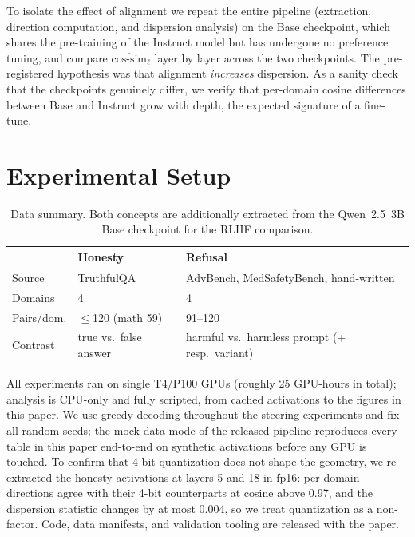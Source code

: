 \documentclass[11pt]{article}
\newcommand{\cosim}{\text{cos-sim}}
\begin{document}
To isolate the effect of alignment we repeat the entire pipeline
(extraction, direction computation, and dispersion analysis) on the Base
checkpoint, which shares the pre-training of the Instruct model but has
undergone no preference tuning, and compare
$\overline{\cosim}_\ell$ layer by layer across the two checkpoints. The
pre-registered hypothesis was that alignment \emph{increases} dispersion. As
a sanity check that the checkpoints genuinely differ, we verify that
per-domain cosine differences between Base and Instruct grow with depth, the
expected signature of a fine-tune.


\section{Experimental Setup}
\label{sec:setup}

\begin{table}[t]
  \centering
  \small
  \renewcommand{\arraystretch}{1.2}
  \begin{tabular}{@{}l p{2.0cm} p{2.7cm}@{}}
    \toprule
    & \textbf{Honesty} & \textbf{Refusal} \\
    \midrule
    Source & TruthfulQA & AdvBench, MedSafetyBench, hand-written \\
    Domains & 4 & 4 \\
    Pairs/dom. & $\le$120 (math 59) & 91--120 \\
    Contrast & true vs.\ false answer & harmful vs.\ harmless prompt (+ resp.\ variant) \\
    \bottomrule
  \end{tabular}
  \caption{Data summary. Both concepts are additionally extracted from the
  Qwen~2.5~3B Base checkpoint for the RLHF comparison.}
  \label{tab:setup}
\end{table}

All experiments ran on single T4/P100 GPUs (roughly 25 GPU-hours in total);
analysis is CPU-only and fully scripted, from cached activations to the
figures in this paper. We use greedy decoding throughout the steering
experiments and fix all random seeds; the mock-data mode of the released
pipeline reproduces every table in this paper end-to-end on synthetic
activations before any GPU is touched. To confirm that 4-bit quantization
does not shape the geometry, we re-extracted the honesty activations at
layers 5 and 18 in fp16: per-domain directions agree with their 4-bit
counterparts at cosine above 0.97, and the dispersion statistic changes
by at most 0.004, so we treat quantization as a non-factor. Code, data
manifests, and validation tooling are released with the paper.
\end{document}
